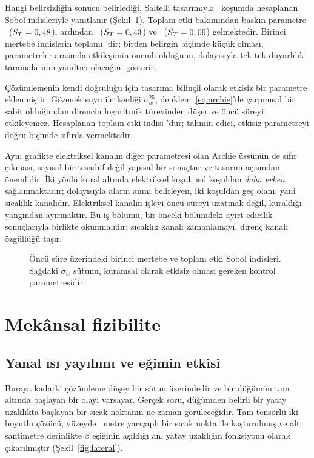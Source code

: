 \documentclass[11pt,a4paper]{article}
\begin{document}
Hangi belirsizliğin sonucu belirlediği, Saltelli tasarımıyla \sobolRuns\
koşumda hesaplanan Sobol indisleriyle yanıtlanır
(Şekil~\ref{fig:sobol}). Toplam etki bakımından baskın parametre
\sobolFirst\ ($S_T = 0,48$), ardından \sobolSecond\
($S_T = 0,43$) ve \sobolThird\ ($S_T = 0,09$)
gelmektedir. Birinci mertebe indislerin toplamı \sobolSum{}'dir; birden
belirgin biçimde küçük olması, parametreler arasında etkileşimin önemli
olduğunu, dolayısıyla tek tek duyarlılık taramalarının yanıltıcı olacağını
gösterir.

Çözümlemenin kendi doğruluğu için tasarıma bilinçli olarak etkisiz bir
parametre eklenmiştir. Gözenek suyu iletkenliği $\sigma_w^{25}$,
denklem~\eqref{eq:archie}'de çarpımsal bir sabit olduğundan direncin
logaritmik türevinden düşer ve öncü süreyi etkileyemez. Hesaplanan toplam
etki indisi \sobolNull{}'dur; tahmin edici, etkisiz parametreyi doğru biçimde
sıfırda vermektedir.

Aynı grafikte elektriksel kanalın diğer parametresi olan Archie üssünün de
sıfır çıkması, sayısal bir tesadüf değil yapısal bir sonuçtur ve tasarım
açısından önemlidir. İki yönlü kural altında elektriksel koşul, ısıl koşuldan
\emph{daha erken} sağlanmaktadır; dolayısıyla alarm anını belirleyen, iki
koşuldan geç olanı, yani sıcaklık kanalıdır. Elektriksel kanalın işlevi öncü
süreyi uzatmak değil, kuraklığı yangından ayırmaktır. Bu iş bölümü, bir önceki
bölümdeki ayırt edicilik sonuçlarıyla birlikte okunmalıdır: sıcaklık kanalı
zamanlamayı, direnç kanalı özgüllüğü taşır.

\begin{figure}[htbp]\centering

\caption{Öncü süre üzerindeki birinci mertebe ve toplam etki Sobol indisleri.
Sağdaki $\sigma_w$ sütunu, kuramsal olarak etkisiz olması gereken kontrol
parametresidir.}
\label{fig:sobol}
\end{figure}

\section{Mekânsal fizibilite}
\label{sec:lateral}

\subsection{Yanal ısı yayılımı ve eğimin etkisi}

Buraya kadarki çözümleme düşey bir sütun üzerindedir ve bir düğümün tam
altında başlayan bir olayı varsayar. Gerçek soru, düğümden belirli bir yatay
uzaklıkta başlayan bir sıcak noktanın ne zaman görüleceğidir. Tam tensörlü iki
boyutlu çözücü, yüzeyde \latSpot~metre yarıçaplı bir sıcak nokta ile
koşturulmuş ve altı santimetre derinlikte $\beta$ eşiğinin aşıldığı an, yatay
uzaklığın fonksiyonu olarak çıkarılmıştır (Şekil~\ref{fig:lateral}).
\end{document}
